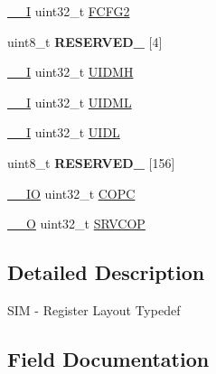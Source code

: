 \begin{DoxyCompactItemize}
\item 
\mbox{\hyperlink{core__cm0plus_8h_af63697ed9952cc71e1225efe205f6cd3}{\+\_\+\+\_\+I}} uint32\+\_\+t \mbox{\hyperlink{struct_s_i_m___type_a48581edecb6a9421e0e159dca5bf8c8c}{F\+C\+F\+G2}}
\item 
\mbox{\label{struct_s_i_m___type_a4e4f1fbee587e08a2b02ff956746fb74}} 
uint8\+\_\+t {\bfseries R\+E\+S\+E\+R\+V\+E\+D\+\_} \mbox{[}4\mbox{]}
\item 
\mbox{\hyperlink{core__cm0plus_8h_af63697ed9952cc71e1225efe205f6cd3}{\+\_\+\+\_\+I}} uint32\+\_\+t \mbox{\hyperlink{struct_s_i_m___type_a6526be9b8cd1160be6ff367641220e96}{U\+I\+D\+MH}}
\item 
\mbox{\hyperlink{core__cm0plus_8h_af63697ed9952cc71e1225efe205f6cd3}{\+\_\+\+\_\+I}} uint32\+\_\+t \mbox{\hyperlink{struct_s_i_m___type_a9d04f09d406768348505eb747ade1e23}{U\+I\+D\+ML}}
\item 
\mbox{\hyperlink{core__cm0plus_8h_af63697ed9952cc71e1225efe205f6cd3}{\+\_\+\+\_\+I}} uint32\+\_\+t \mbox{\hyperlink{struct_s_i_m___type_aac796478e9fdd908d4bccc7b754de080}{U\+I\+DL}}
\item 
\mbox{\label{struct_s_i_m___type_a2139860497710bc375266dc42d96ee6c}} 
uint8\+\_\+t {\bfseries R\+E\+S\+E\+R\+V\+E\+D\+\_} \mbox{[}156\mbox{]}
\item 
\mbox{\hyperlink{core__cm0plus_8h_aec43007d9998a0a0e01faede4133d6be}{\+\_\+\+\_\+\+IO}} uint32\+\_\+t \mbox{\hyperlink{struct_s_i_m___type_aa35d8ef46eb486a961d6a3c4d5b3441f}{C\+O\+PC}}
\item 
\mbox{\hyperlink{core__cm0plus_8h_a7e25d9380f9ef903923964322e71f2f6}{\+\_\+\+\_\+O}} uint32\+\_\+t \mbox{\hyperlink{struct_s_i_m___type_a57790bed2fb6759181812845dbca3eb8}{S\+R\+V\+C\+OP}}
\end{DoxyCompactItemize}


\subsection{Detailed Description}
S\+IM -\/ Register Layout Typedef 

\subsection{Field Documentation}
\mbox{\label{struct_s_i_m___type_a063b97a92c34c2c0cb7f8746f9f50f3c}} 
